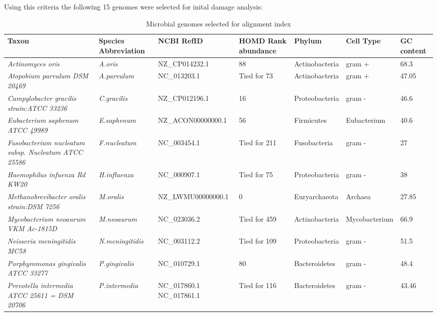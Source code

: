 \documentclass[12pt, a4paper]{article}
\renewcommand{\arraystretch}{1.2}
\newcommand{\ra}[1]{\renewcommand{\arraystretch}{#1}}
\begin{document}
Using this criteria the following 15 genomes were selected for inital damage analysis:

\begin{landscape}
\begin{table}[h]
\centering\footnotesize
\ra{1.3}
\setlength{\tabcolsep}{6pt} %
	\caption{Microbial genomes selected for alignment index}\label{table:15microbes}
		\begin{tabular}{C{7cm} L{2.5cm} L{3.5cm} C{2cm} L{2.5cm} C{2.5cm} L{1.5cm} }   				\toprule
			{Taxon}&{Species Abbreviation}&{NCBI RefID}&{HOMD Rank abundance}&{Phylum}&{Cell Type}&{GC content}\\[5pt] \midrule
		{\textit{Actinomyces oris}}&{\textit{A.oris}}&{NZ\_CP014232.1}&{88}&{Actinobacteria}&{gram +}&{68.3}\\[5pt]
		{\textit{Atopobium parvulum DSM 20469}}&{\textit{A.parvulum}}&{NC\_013203.1}&{Tied for 73}&{Actinobacteria}&{gram +}&{47.05}\\[5pt]
		{\textit{Campylobacter gracilis strain:ATCC 33236}}&{\textit{C.gracilis}}&{NZ\_CP012196.1}&{16}&{Proteobacteria}&{gram -}&{46.6}\\[5pt]
		{\textit{Eubacterium saphenum ATCC 49989}}&{\textit{E.saphenum}}&{NZ\_ACON00000000.1}&{56}&{Firmicutes}&{Eubacterium}&{40.6}\\[5pt]
		{\textit{Fusobacterium nucleatum subsp. Nucleatum ATCC 25586}}&{\textit{F.nucleatum}}&{NC\_003454.1}&{Tied for 211}&{Fusobacteria}&{gram -}&{27}\\[5pt]
		{\textit{Haemophilus infuenza Rd KW20}}&{\textit{H.influenza}}&{NC\_000907.1}&{Tied for 75}&{Proteobacteria}&{gram -}&{38}\\[5pt]
		{\textit{Methanobrevibacter oralis strain:DSM 7256}}&{\textit{M.oralis}}&{NZ\_LWMU00000000.1}&{0}&{Euryarchaeota}&{Archaea}&{27.85}\\[5pt]
		{\textit{Mycobacterium neoaurum VKM Ac-1815D}}&{\textit{M.neoaurum}}&{NC\_023036.2}&{Tied for 459}&{Actinobacteria}&{Mycobacterium}&{66.9}\\[5pt]
		{\textit{Neisseria meningitidis MC58}}&{\textit{N.meningitidis}}&{NC\_003112.2}&{Tied for 109}&{Proteobacteria}&{gram -}&{51.5}\\[5pt]
		{\textit{Porphyromonas gingivalis ATCC 33277}}&{\textit{P.gingivalis}}&{NC\_010729.1}&{80}&{Bacteroidetes}&{gram -}&{48.4}\\[5pt]
		{\textit{Prevotella intermedia ATCC 25611 = DSM 20706}}&{\textit{P.intermedia}}&{NC\_017860.1 NC\_017861.1}&{Tied for 116}&{Bacteroidetes}&{gram -}&{43.46}\\[5pt]

\end{tabular}
\end{table}
\end{landscape}
\end{document}
